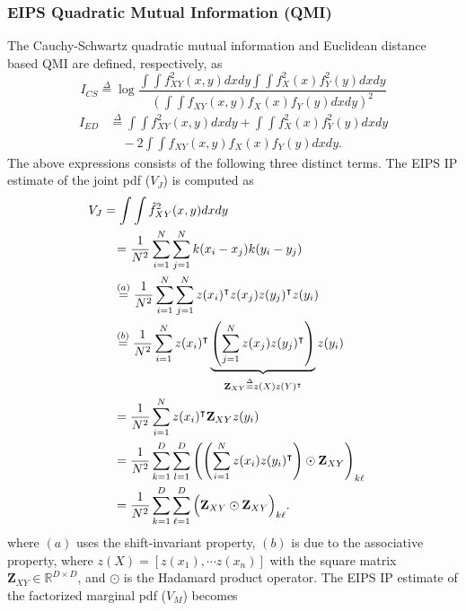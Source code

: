 \documentclass[8pt,twocolumn]{IEEEtran}
\newcommand{\R}{\mathbb{R}}
\begin{document}
\subsubsection{EIPS Quadratic Mutual Information (QMI)}
The Cauchy-Schwartz quadratic mutual information and Euclidean distance based QMI are defined, respectively, as
\begin{equation}
I_{CS}\stackrel{\Delta}{=}\log \frac{\int\int f^2_{XY}(x,y)dxdy\int\int f^2_{X}(x)f^2_Y(y)dxdy}{\left(\int\int f_{XY}(x,y)f_X(x)f_Y(y)dxdy\right)^2}
\end{equation}
\begin{align}
I_{ED} &\stackrel{\Delta}{=}\int\int f^2_{XY}(x,y)dxdy+\int\int f^2_{X}(x)f^2_Y(y)dxdy\nonumber\\
& \quad -2\int\int f_{XY}(x,y)f_X(x)f_Y(y)dxdy.
\end{align}
The above expressions consists of the following three distinct terms. The EIPS IP estimate of the joint pdf ($V_J$) is computed as
\begin{align}
\lefteqn{V_J=\int\int \hat{f}^2_{XY}(x,y)dxdy}\nonumber\\
& & & & &= \frac{1}{N^2}\sum_{i=1}^{N}\sum_{j=1}^{N} k(x_i-x_j)k(y_i-y_j)\nonumber\\
& & & & &\stackrel{(a)}{=}\frac{1}{N^2}\sum_{i=1}^{N}\sum_{j=1}^{N} z(x_i)^\intercal z(x_j)z(y_j)^\intercal z(y_i)\nonumber\\
& & & & &\stackrel{(b)}{=}\frac{1}{N^2}\sum_{i=1}^{N}z(x_i)^\intercal\underbrace{\left(\sum_{j=1}^{N}z(x_j)z(y_j)^\intercal\right)}_{\mathbf{Z}_{XY}\stackrel{\Delta}{=}z(X)z(Y)^\intercal} z(y_i)\nonumber\\
& & & & &=\frac{1}{N^2}\sum_{i=1}^{N}z(x_i)^\intercal  \mathbf{Z}_{XY} z(y_i)\nonumber\\
& & & & &=\frac{1}{N^2}\sum_{k=1}^{D}\sum_{l=1}^{D}\left(\left(\sum_{i=1}^{N}z(x_i) z(y_i)^\intercal\right)\odot \mathbf{Z}_{XY}\right)_{k\ell}\nonumber\\
& & & & &=\frac{1}{N^2}\sum_{k=1}^{D}\sum_{\ell=1}^{D}\Big(\mathbf{Z}_{XY}\odot \mathbf{Z}_{XY}\Big)_{k\ell}.
\end{align}
where $(a)$ uses the shift-invariant property, $(b)$ is due to the associative property, where $z(X)=[z(x_1),\cdots z(x_n)]$ with the square matrix $\mathbf{Z}_{XY}\in\R^{D\times D}$, and $\odot$ is the Hadamard product operator. The EIPS IP estimate of the factorized marginal pdf ($V_M$) becomes
\end{document}
